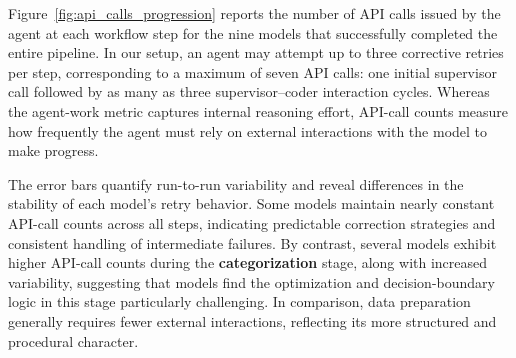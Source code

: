 \documentclass[aps,prd,reprint,superscriptaddress]{revtex4-2}
\begin{document}

Figure~\ref{fig:api_calls_progression} reports the number of API calls issued by the agent at each workflow step for the nine models that successfully completed the entire pipeline. In our setup, an agent may attempt up to three corrective retries per step, corresponding to a maximum of seven API calls: one initial supervisor call followed by as many as three supervisor–coder interaction cycles. Whereas the agent-work metric captures internal reasoning effort, API-call counts measure how frequently the agent must rely on external interactions with the model to make progress.

The error bars quantify run-to-run variability and reveal differences in the stability of each model’s retry behavior. Some models maintain nearly constant API-call counts across all steps, indicating predictable correction strategies and consistent handling of intermediate failures. By contrast, several models exhibit higher API-call counts during the \textbf{categorization} stage, along with increased variability, suggesting that models find the optimization and decision-boundary logic in this stage particularly challenging. In comparison, data preparation generally requires fewer external interactions, reflecting its more structured and procedural character.
\end{document}
